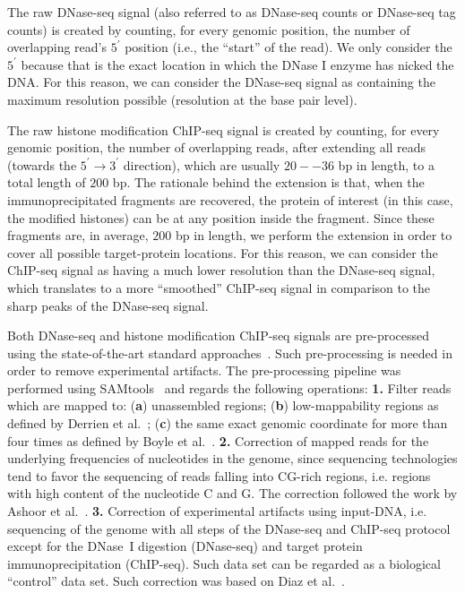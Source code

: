The raw DNase-seq signal (also referred to as DNase-seq counts or DNase-seq tag counts) is created by counting, for every genomic position, the number of overlapping read's $5^\prime$ position (i.e., the ``start'' of the read). We only consider the $5^\prime$ because that is the exact location in which the DNase I enzyme has nicked the DNA. For this reason, we can consider the DNase-seq signal as containing the maximum resolution possible (resolution at the base pair level).

The raw histone modification ChIP-seq signal is created by counting, for every genomic position, the number of overlapping reads, after extending all reads (towards the $5^\prime \rightarrow 3^\prime$ direction), which are usually $20--36$ bp in length, to a total length of $200$ bp. The rationale behind the extension is that, when the immunoprecipitated fragments are recovered, the protein of interest (in this case, the modified histones) can be at any position inside the fragment. Since these fragments are, in average, $200$ bp in length, we perform the extension in order to cover all possible target-protein locations. For this reason, we can consider the ChIP-seq signal as having a much lower resolution than the DNase-seq signal, which translates to a more ``smoothed'' ChIP-seq signal in comparison to the sharp peaks of the DNase-seq signal.

Both DNase-seq and histone modification ChIP-seq signals are pre-processed using the state-of-the-art standard approaches~\cite{li2009a,li2011a}. Such pre-processing is needed in order to remove experimental artifacts. The pre-processing pipeline was performed using SAMtools~\cite{li2009a} and regards the following operations:
\vspace{0.2cm}
\noindent
\textbf{1.} Filter reads which are mapped to: (\textbf{a}) unassembled regions; (\textbf{b}) low-mappability regions as defined by Derrien et al.~\cite{derrien2012}; (\textbf{c}) the same exact genomic coordinate for more than four times as defined by Boyle et al.~\cite{boyle2011}.
\noindent
\textbf{2.} Correction of mapped reads for the underlying frequencies of nucleotides in the genome, since sequencing technologies tend to favor the sequencing of reads falling into CG-rich regions, i.e. regions with high content of the nucleotide C and G. The correction followed the work by Ashoor et al.~\cite{ashoor2013}.
\noindent
\textbf{3.} Correction of experimental artifacts using input-DNA, i.e. sequencing of the genome with all steps of the DNase-seq and ChIP-seq protocol except for the DNase~I digestion (DNase-seq) and target protein immunoprecipitation (ChIP-seq). Such data set can be regarded as a biological ``control'' data set. Such correction was based on Diaz et al.~\cite{diaz2012}.
\vspace{0.2cm}

